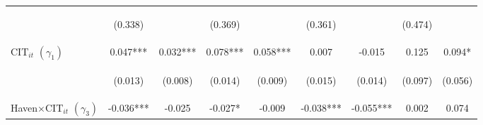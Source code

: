 \begin{center}
\begin{tabular}{lcccccccc}
\vspace{4pt} & \begin{footnotesize}(0.338)\end{footnotesize} & \begin{footnotesize}\end{footnotesize} & \begin{footnotesize}(0.369)\end{footnotesize} & \begin{footnotesize}\end{footnotesize} & \begin{footnotesize}(0.361)\end{footnotesize} & \begin{footnotesize}\end{footnotesize} & \begin{footnotesize}(0.474)\end{footnotesize} & \begin{footnotesize}\end{footnotesize} \\
$ \text{CIT}_{it}$ $(\gamma_1)$ & 0.047*** & 0.032*** & 0.078*** & 0.058*** & 0.007 & -0.015 & 0.125 & 0.094* \\
\vspace{4pt} & \begin{footnotesize}(0.013)\end{footnotesize} & \begin{footnotesize}(0.008)\end{footnotesize} & \begin{footnotesize}(0.014)\end{footnotesize} & \begin{footnotesize}(0.009)\end{footnotesize} & \begin{footnotesize}(0.015)\end{footnotesize} & \begin{footnotesize}(0.014)\end{footnotesize} & \begin{footnotesize}(0.097)\end{footnotesize} & \begin{footnotesize}(0.056)\end{footnotesize} \\
Haven$\times\text{CIT}_{it}$ $ (\gamma_3)$ & -0.036*** & -0.025 & -0.027* & -0.009 & -0.038*** & -0.055*** & 0.002 & 0.074 \\

\end{tabular}
\end{center}
